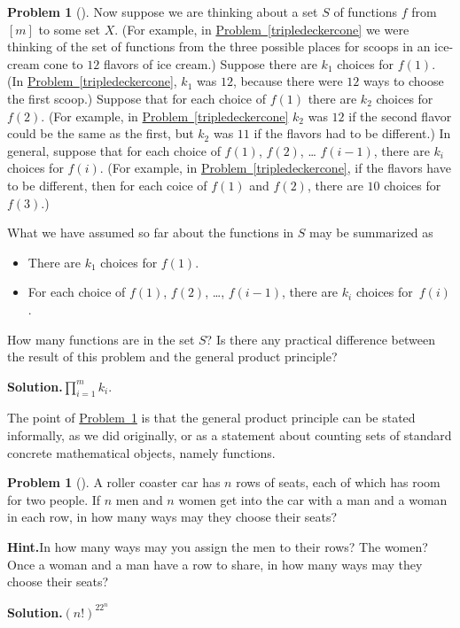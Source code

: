 \documentclass[10pt,]{book}
\theoremstyle{plain}
\theoremstyle{definition}
\newtheorem{activity}[project]{Problem}
\theoremstyle{definition}
\numberwithin{equation}{chapter}
\begin{document}
\begin{activity}[]\label{generalproductprinciple}
Now suppose we are thinking about a set \(S\) of functions \(f\) from \([m]\) to some set \(X\). (For example, in \hyperref[tripledeckercone]{Problem~\ref{tripledeckercone}} we were thinking of the set of functions from the three possible places for scoops in an ice-cream cone to \(12\) flavors of ice cream.) Suppose there are \(k_1\) choices for \(f(1)\). (In \hyperref[tripledeckercone]{Problem~\ref{tripledeckercone}}, \(k_1\) was \(12\), because there were \(12\) ways to choose the first scoop.) Suppose that for each choice of \(f(1)\) there are \(k_2\) choices for \(f(2)\). (For example, in \hyperref[tripledeckercone]{Problem~\ref{tripledeckercone}} \(k_2\) was \(12\) if the second flavor could be the same as the first, but \(k_2\) was \(11\) if the flavors had to be different.) In general, suppose that for each choice of \(f(1)\), \(f(2)\), \dots{} \(f(i-1)\), there are \(k_i\) choices for \(f(i)\). (For example, in \hyperref[tripledeckercone]{Problem~\ref{tripledeckercone}}, if the flavors have to be different, then for each coice of \(f(1)\) and \(f(2)\), there are \(10\) choices for \(f(3)\).)%
\par
What we have assumed so far about the functions in \(S\) may be summarized as \leavevmode%
\begin{itemize}[label=\textbullet]
\item{}There are \(k_1\) choices for \(f(1)\).%
\item{}For each choice of \(f(1)\), \(f(2)\), \dots{}, \(f(i-1)\), there are \(k_i\) choices for~\(f(i)\).%
\end{itemize}
%
\par
How many functions are in the set \(S\)? Is there any practical difference between the result of this problem and the general product principle?%
\par\medskip\noindent%
\textbf{Solution.}\quad \(\prod_{i=1}^m k_i\).%
\end{activity}
The point of \hyperref[generalproductprinciple]{Problem~\ref{generalproductprinciple}} is that the general product principle can be stated informally, as we did originally, or as a statement about counting sets of standard concrete mathematical objects, namely functions.%
\begin{activity}[]\label{activity-15}
A roller coaster car has \(n\) rows of seats, each of which has room for two people. If \(n\) men and \(n\) women get into the car with a man and a woman in each row, in how many ways may they choose their seats?%
\par\medskip\noindent%
\textbf{Hint.}\quad In how many ways may you assign the men to their rows? The women? Once a woman and a man have a row to share, in how many ways may they choose their seats?%
\par\medskip\noindent%
\textbf{Solution.}\quad \((n!)^22^n\)%
\end{activity}
\end{document}
